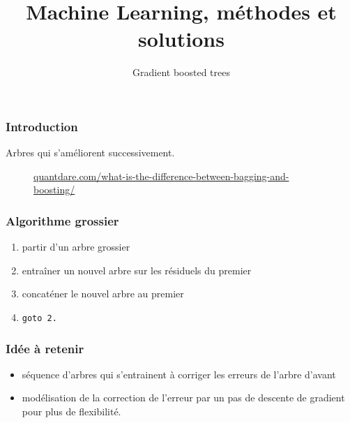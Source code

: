 \documentclass{formation}
\title{Machine Learning, méthodes et solutions}
\subtitle{Gradient boosted trees}
\begin{document}
\maketitle

\begin{frame}
  \frametitle{Introduction}
  Arbres qui s'améliorent successivement.
  \begin{figure}
    \centering {}
    \scriptsize{\href{https://quantdare.com/what-is-the-difference-between-bagging-and-boosting/}%
        {quantdare.com/what-is-the-difference-between-bagging-and-boosting/}}
  \end{figure}
\end{frame}

\begin{frame}
  \frametitle{Algorithme grossier}
  \begin{enumerate}
  \item partir d'un arbre grossier
  \item entraîner un nouvel arbre sur les résiduels du premier
  \item concaténer le nouvel arbre au premier
  \item \texttt{goto 2.}
  \end{enumerate}
\end{frame}

\begin{frame}
  \frametitle{Idée à retenir}
  \begin{itemize}
  \item séquence d'arbres qui s'entrainent à corriger les erreurs de
    l'arbre d'avant
  \item modélisation de la correction de l'erreur par un pas de
    descente de gradient pour plus de flexibilité.
  \end{itemize}
\end{frame}
\end{document}
